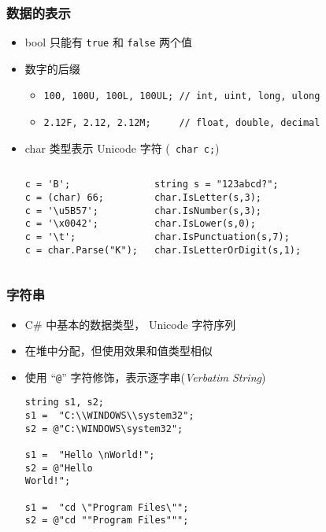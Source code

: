 \begin{frame}[fragile]
\frametitle{数据的表示}

\begin{itemize}
\item bool 只能有 \lstinline|true| 和 \lstinline|false| 两个值 \pause
\item 数字的后缀
  \begin{itemize}
  \item \lstinline|100, 100U, 100L, 100UL; // int, uint, long, ulong|
  \item \lstinline|2.12F, 2.12, 2.12M;     // float, double, decimal|
  \end{itemize}
\pause
\item char 类型表示 Unicode 字符 (\lstinline| char c;|)
  \begin{columns}
\begin{lstlisting}
c = 'B';
c = (char) 66;
c = '\u5B57';
c = '\x0042';
c = '\t';
c = char.Parse("K");
\end{lstlisting}
\begin{lstlisting}
string s = "123abcd?";
char.IsLetter(s,3);
char.IsNumber(s,3);
char.IsLower(s,0);
char.IsPunctuation(s,7);
char.IsLetterOrDigit(s,1);
\end{lstlisting}
  \end{columns}
\end{itemize}
\end{frame}

\begin{frame}[fragile]
\frametitle{字符串}
\begin{itemize}
\item C\# 中基本的数据类型， Unicode 字符序列\pause
\item 在堆中分配，但使用效果和值类型相似\pause
\item 使用 ``\texttt{@}'' 字符修饰，表示{\redwarn 逐字串}(\textit{Verbatim String})
\begin{lstlisting}
string s1, s2;
s1 =  "C:\\WINDOWS\\system32";
s2 = @"C:\WINDOWS\system32";

s1 =  "Hello \nWorld!";
s2 = @"Hello
World!";

s1 =  "cd \"Program Files\"";
s2 = @"cd ""Program Files""";
\end{lstlisting}
\end{itemize}
\end{frame}

